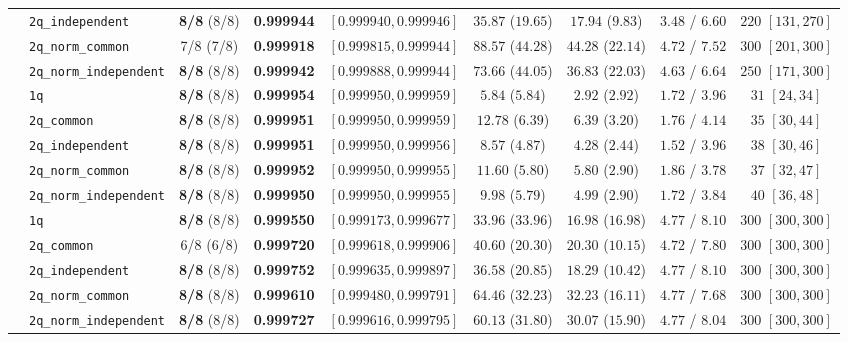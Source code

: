\documentclass[10pt,a4paper]{article}
\begin{document}
\begin{table}[h!]
{\begin{tabular}{llccccccc}
  & \texttt{2q\_independent} & \textbf{8/8} (8/8) & \textbf{0.999944} & $[0.999940, 0.999946]$ & $35.87$ ($19.65$) & $17.94$ ($9.83$) & $3.48$ / $6.60$ & $220$ $[131, 270]$ \\
  & \texttt{2q\_norm\_common} & 7/8 (7/8) & \textbf{0.999918} & $[0.999815, 0.999944]$ & $88.57$ ($44.28$) & $44.28$ ($22.14$) & $4.72$ / $7.52$ & $300$ $[201, 300]$ \\
  & \texttt{2q\_norm\_independent} & \textbf{8/8} (8/8) & \textbf{0.999942} & $[0.999888, 0.999944]$ & $73.66$ ($44.05$) & $36.83$ ($22.03$) & $4.63$ / $6.64$ & $250$ $[171, 300]$ \\
\midrule
  & \texttt{1q} & \textbf{8/8} (8/8) & \textbf{0.999954} & $[0.999950, 0.999959]$ & $5.84$ ($5.84$) & $2.92$ ($2.92$) & $1.72$ / $3.96$ & $31$ $[24, 34]$ \\
  & \texttt{2q\_common} & \textbf{8/8} (8/8) & \textbf{0.999951} & $[0.999950, 0.999959]$ & $12.78$ ($6.39$) & $6.39$ ($3.20$) & $1.76$ / $4.14$ & $35$ $[30, 44]$ \\
  & \texttt{2q\_independent} & \textbf{8/8} (8/8) & \textbf{0.999951} & $[0.999950, 0.999956]$ & $8.57$ ($4.87$) & $4.28$ ($2.44$) & $1.52$ / $3.96$ & $38$ $[30, 46]$ \\
  & \texttt{2q\_norm\_common} & \textbf{8/8} (8/8) & \textbf{0.999952} & $[0.999950, 0.999955]$ & $11.60$ ($5.80$) & $5.80$ ($2.90$) & $1.86$ / $3.78$ & $37$ $[32, 47]$ \\
  & \texttt{2q\_norm\_independent} & \textbf{8/8} (8/8) & \textbf{0.999950} & $[0.999950, 0.999955]$ & $9.98$ ($5.79$) & $4.99$ ($2.90$) & $1.72$ / $3.84$ & $40$ $[36, 48]$ \\
\midrule
  & \texttt{1q} & \textbf{8/8} (8/8) & \textbf{0.999550} & $[0.999173, 0.999677]$ & $33.96$ ($33.96$) & $16.98$ ($16.98$) & $4.77$ / $8.10$ & $300$ $[300, 300]$ \\
  & \texttt{2q\_common} & 6/8 (6/8) & \textbf{0.999720} & $[0.999618, 0.999906]$ & $40.60$ ($20.30$) & $20.30$ ($10.15$) & $4.72$ / $7.80$ & $300$ $[300, 300]$ \\
  & \texttt{2q\_independent} & \textbf{8/8} (8/8) & \textbf{0.999752} & $[0.999635, 0.999897]$ & $36.58$ ($20.85$) & $18.29$ ($10.42$) & $4.77$ / $8.10$ & $300$ $[300, 300]$ \\
  & \texttt{2q\_norm\_common} & \textbf{8/8} (8/8) & \textbf{0.999610} & $[0.999480, 0.999791]$ & $64.46$ ($32.23$) & $32.23$ ($16.11$) & $4.77$ / $7.68$ & $300$ $[300, 300]$ \\
  & \texttt{2q\_norm\_independent} & \textbf{8/8} (8/8) & \textbf{0.999727} & $[0.999616, 0.999795]$ & $60.13$ ($31.80$) & $30.07$ ($15.90$) & $4.77$ / $8.04$ & $300$ $[300, 300]$ \\
\bottomrule
\end{tabular}%
}
\end{table}
\end{document}
